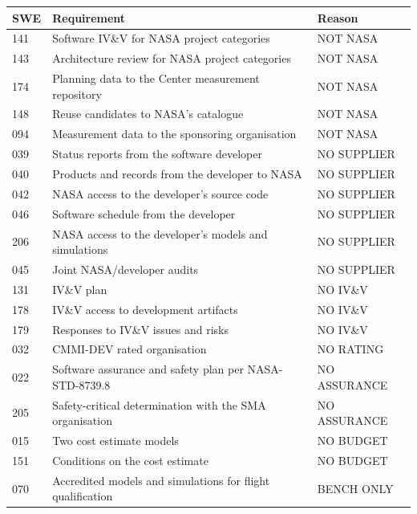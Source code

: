 \documentclass[11pt,a4paper]{article}
\begin{document}
\begin{table}[H]
\centering
\small
\begin{tabular}{@{}lll@{}}
\toprule
SWE & Requirement & Reason \\
\midrule
141 & Software IV\&V for NASA project categories & NOT NASA \\
143 & Architecture review for NASA project categories & NOT NASA \\
174 & Planning data to the Center measurement repository & NOT NASA \\
148 & Reuse candidates to NASA's catalogue & NOT NASA \\
094 & Measurement data to the sponsoring organisation & NOT NASA \\
039 & Status reports from the software developer & NO SUPPLIER \\
040 & Products and records from the developer to NASA & NO SUPPLIER \\
042 & NASA access to the developer's source code & NO SUPPLIER \\
046 & Software schedule from the developer & NO SUPPLIER \\
206 & NASA access to the developer's models and simulations & NO SUPPLIER \\
045 & Joint NASA/developer audits & NO SUPPLIER \\
131 & IV\&V plan & NO IV\&V \\
178 & IV\&V access to development artifacts & NO IV\&V \\
179 & Responses to IV\&V issues and risks & NO IV\&V \\
032 & CMMI-DEV rated organisation & NO RATING \\
022 & Software assurance and safety plan per NASA-STD-8739.8 & NO ASSURANCE \\
205 & Safety-critical determination with the SMA organisation & NO ASSURANCE \\
015 & Two cost estimate models & NO BUDGET \\
151 & Conditions on the cost estimate & NO BUDGET \\
070 & Accredited models and simulations for flight qualification & BENCH ONLY \\
\bottomrule
\end{tabular}
\end{table}
\end{document}
